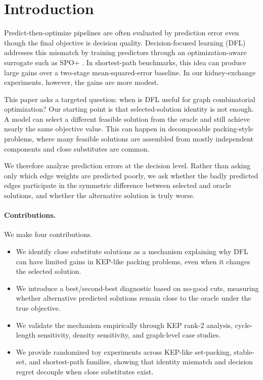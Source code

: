 \section{Introduction}

Predict-then-optimize pipelines are often evaluated by prediction error even
though the final objective is decision quality. Decision-focused learning (DFL)
addresses this mismatch by training predictors through an optimization-aware
surrogate such as SPO+ \citep{elmachtoub2022smart}. In shortest-path benchmarks,
this idea can produce large gains over a two-stage mean-squared-error baseline.
In our kidney-exchange experiments, however, the gains are more modest.

This paper asks a targeted question: when is DFL useful for graph combinatorial
optimization? Our starting point is that selected-solution identity is not
enough. A model can select a different feasible solution from the oracle and
still achieve nearly the same objective value. This can happen in decomposable
packing-style problems, where many feasible solutions are assembled from mostly
independent components and close substitutes are common.

We therefore analyze prediction errors at the decision level. Rather than asking
only which edge weights are predicted poorly, we ask whether the badly predicted
edges participate in the symmetric difference between selected and oracle
solutions, and whether the alternative solution is truly worse.

\paragraph{Contributions.}
We make four contributions.
\begin{itemize}
    \item We identify close substitute solutions as a mechanism explaining why
    DFL can have limited gains in KEP-like packing problems, even when it
    changes the selected solution.
    \item We introduce a best/second-best diagnostic based on no-good cuts,
    measuring whether alternative predicted solutions remain close to the oracle
    under the true objective.
    \item We validate the mechanism empirically through KEP rank-2 analysis,
    cycle-length sensitivity, density sensitivity, and graph-level case studies.
    \item We provide randomized toy experiments across KEP-like set-packing,
    stable-set, and shortest-path families, showing that identity mismatch and
    decision regret decouple when close substitutes exist.
\end{itemize}
